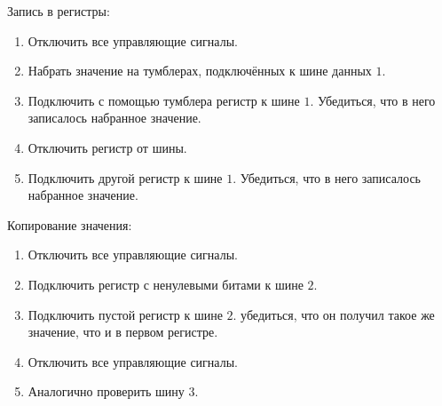 Запись в регистры:

\begin{enumerate}
    \item Отключить все управляющие сигналы.
    \item Набрать значение на тумблерах, подключённых к шине данных $1$.
    \item Подключить с помощью тумблера регистр к шине $1$. Убедиться, что в него записалось набранное значение.
    \item Отключить регистр от шины.
    \item Подключить другой регистр к шине $1$. Убедиться, что в него записалось набранное значение.
\end{enumerate}

Копирование значения:

\begin{enumerate}
    \item Отключить все управляющие сигналы.
    \item Подключить регистр с ненулевыми битами к шине $2$.
    \item Подключить пустой регистр к шине $2$. убедиться, что он получил такое же значение, что и в первом регистре.
    \item Отключить все управляющие сигналы.
    \item Аналогично проверить шину $3$.
\end{enumerate}

